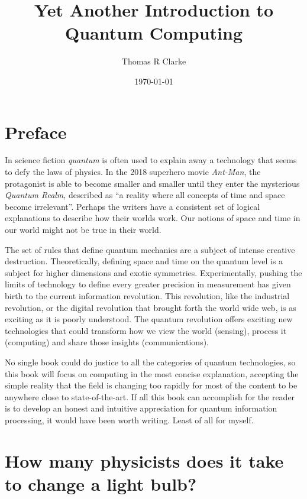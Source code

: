 \documentclass{book}
\title{Yet Another Introduction to Quantum Computing}
\author{Thomas R Clarke}
\date{\today}
\begin{document}
\maketitle

\chapter*{Preface}

In science fiction \textit{quantum} is often used to explain away a technology that seems to defy the laws of physics. In the 2018 superhero movie \textit{Ant-Man}, the protagonist is able to become smaller and smaller until they enter the mysterious \textit{Quantum Realm}, described as “a reality where all concepts of time and space become irrelevant”. Perhaps the writers have a consistent set of logical explanations to describe how their worlds work. Our notions of space and time in our world might not be true in their world. 

The set of rules that define quantum mechanics are a subject of intense creative destruction. Theoretically, defining space and time on the quantum level is a subject for higher dimensions and exotic symmetries. Experimentally, pushing the limits of technology to define every greater precision in measurement has given birth to the current information revolution. This revolution, like the industrial revolution, or the digital revolution that brought forth the world wide web, is as exciting as it is poorly understood. The quantum revolution offers exciting new technologies that could transform how we view the world (sensing), process it (computing) and share those insights (communications). 

No single book could do justice to all the categories of quantum technologies, so this book will focus on computing in the most concise explanation, accepting the simple reality that the field is changing too rapidly for most of the content to be anywhere close to state-of-the-art. If all this book can accomplish for the reader is to develop an honest and intuitive appreciation for quantum information processing, it would have been worth writing. Least of all for myself. 

\tableofcontents



\chapter{How many physicists does it take to change a light bulb?}
\end{document}
